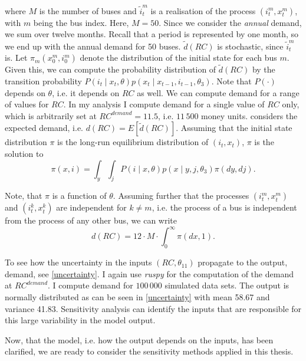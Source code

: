 \noindent where $M$ is the number of buses and ${\tilde{i}}_t^m$ is a realisation of the process $(i_t^m, x_t^m)$, with $m$ being the bus index. Here, $M=50$. Since we consider the \textit{annual} demand, we sum over twelve months. Recall that a period is represented by one month, so we end up with the annual demand for 50 buses. $\tilde{d}(RC)$ is stochastic, since ${\tilde{i}}_t^m$ is. Let $\pi_m(x_0^m, i_0^m)$ denote the distribution of the initial state for each bus $m$. Given this, we can compute the probability distribution of $\tilde{d}(RC) $ by the transition probability $P(i_t \mid x_t, \theta)p(x_t \mid x_{t-1}, i_{t-1}, \theta_3) $. Note that $P(\cdot)$ depends on $\theta$, i.e. it depends on $RC$ as well. We can compute demand for a range of values for $RC$. In my analysis I compute demand for a single value of $RC$ only, which is arbitrarily set at $RC^{demand}=11.5$, i.e. $11\,500$ money units. \citet{R87} considers the expected demand, i.e. $d(RC)=E[\tilde{d}(RC)]$. Assuming that the initial state distribution $\pi$ is the long-run equilibrium distribution of $(i_t, x_t)$, $\pi$ is the solution to
\begin{equation*}
\pi(x, i)=\int_y \int_j P(i \mid x, \theta) p(x \mid y, j, \theta_3) \pi(dy, dj).
\end{equation*}

Note, that $\pi$ is a function of $\theta$. Assuming further that the processes $ (i_t^m, x_t^m)$ and $(i_t^k, x_t^k)$ are independent for $k \neq m$, i.e. the process of a bus is independent from the process of any other bus, we can write
\begin{equation*}
d(RC)=12 \cdot M \cdot \int_0^{\infty} \pi(dx, 1).
\end{equation*}

To see how the uncertainty in the inputs $(RC, \theta_{11})$ propagate to the output, demand, see \cref{uncertainty}. I again use \textit{ruspy} for the computation of the demand at $RC^{demand}$. I compute demand for $100\,000$ simulated data sets. The output is normally distributed as can be seen in \cref{uncertainty} with mean 58.67 and variance 41.83. Sensitivity analysis can identify the inputs that are responsible for this large variability in the model output.

Now, that the model, i.e. how the output depends on the inputs, has been clarified, we are ready to consider the sensitivity methods applied in this thesis.
